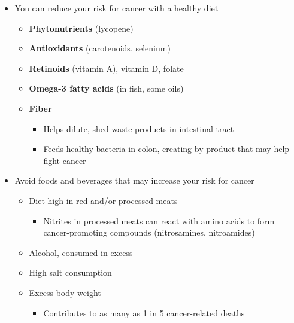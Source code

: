\documentclass[12pt]{article}
\begin{document}
\begin{itemize}
                \item You can reduce your risk for cancer with a healthy diet
                    \begin{itemize}
                        \item \textbf{Phytonutrients} (lycopene)
                        \item \textbf{Antioxidants} (carotenoids, selenium)
                        \item \textbf{Retinoids} (vitamin A), vitamin D, folate
                        \item \textbf{Omega-3 fatty acids} (in fish, some oils)
                        \item \textbf{Fiber}
                            \begin{itemize}
                                \item Helps dilute, shed waste products in intestinal tract
                                \item Feeds healthy bacteria in colon, creating by-product that may help fight cancer
                            \end{itemize}
                    \end{itemize}
                \item Avoid foods and beverages that may increase your risk for cancer
                    \begin{itemize}
                        \item Diet high in red and/or processed meats
                            \begin{itemize}
                                \item Nitrites in processed meats can react with amino acids to form cancer-promoting compounds (nitrosamines, nitroamides)
                            \end{itemize}
                        \item Alcohol, consumed in excess
                        \item High salt consumption
                        \item Excess body weight
                            \begin{itemize}
                                \item Contributes to as many as 1 in 5 cancer-related deaths
                            \end{itemize}
                    \end{itemize}
            \end{itemize}
\end{document}
